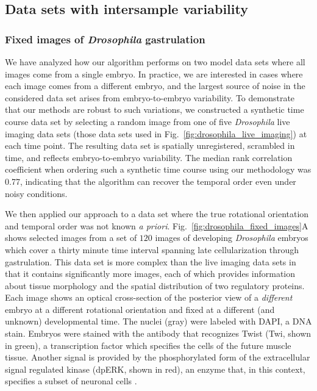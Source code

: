 \documentclass[twocolumn, 10pt]{article}
\newcommand{\fig}[0]{Fig.}
\begin{document}
\subsection*{Data sets with intersample variability}

\subsubsection*{Fixed images of {\em Drosophila} gastrulation}


We have analyzed how our algorithm performs on two model data sets where all images come from a single embryo.
%
In practice, we are interested in cases where each image comes from a different embryo, and the largest source of noise in the considered data set arises from embryo-to-embryo variability.
%
To demonstrate that our methods are robust to such variations,
we constructed a synthetic time course data set by selecting a random image from one of five {\em Drosophila} live imaging data sets (those data sets used in \fig~\ref{fig:drosophila_live_imaging}) at each time point.
%
The resulting data set is spatially unregistered, scrambled in time, and reflects embryo-to-embryo variability.
%
The median rank correlation coefficient when ordering such a synthetic time course using our methodology was 0.77, indicating that the algorithm can recover the temporal order even under noisy conditions.

We then applied our approach to a data set where the true rotational orientation and temporal order was not known {\it a priori}.
%
\fig~\ref{fig:drosophila_fixed_images}A shows selected images from a set of $120$ images of developing {\em Drosophila} embryos which cover a thirty minute time interval spanning late cellularization through gastrulation.
%
This data set is more complex than the live imaging data sets in that it contains significantly more images, each of which provides information about tissue morphology and the spatial distribution of two regulatory proteins.
%
Each image shows an optical cross-section of the posterior view of a {\em different} embryo at a different rotational orientation and fixed at a different (and unknown) developmental time.
%
The nuclei (gray) were labeled with DAPI, a DNA stain.
%
Embryos were stained with the antibody that recognizes Twist (Twi, shown in green), a transcription factor which specifies the cells of the future muscle tissue.
%
Another signal is provided by the phosphorylated form of the extracellular signal regulated kinase (dpERK, shown in red), an enzyme that, in this context, specifies a subset of neuronal cells \citep{Lim2013kinetics}.
\end{document}
